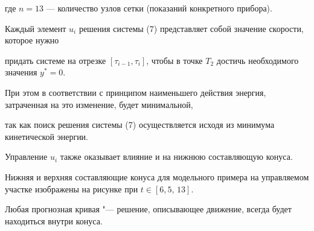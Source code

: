 где $n=13$ --- количество узлов сетки (показаний конкретного прибора).



Каждый элемент $u_i$ решения системы (7) представляет собой значение скорости, которое нужно

придать системе на отрезке $[\tau_{i-1}, \tau_i ]$, чтобы в точке $T_2 $ достичь необходимого значения $y^*=0$.

При этом в соответствии с принципом наименьшего действия энергия, затраченная на это изменение, будет минимальной,

так как поиск решения системы (7) осуществляется исходя из минимума кинетической энергии.



Управление $u_i$ также оказывает влияние и на нижнюю составляющую конуса.

Нижняя и верхняя составляющие конуса для модельного примера на управляемом участке изображены на рисунке при $t\in [6,5,\, 13]$.

Любая прогнозная кривая "--- решение, описывающее движение, всегда будет находиться внутри конуса.
















